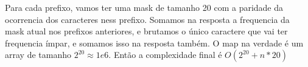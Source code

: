 % 

Para cada prefixo, vamos ter uma mask de tamanho 20 com a paridade da ocorrencia dos caracteres ness prefixo. Somamos na resposta a frequencia da mask atual nos prefixos anteriores, e brutamos o único caractere que vai ter frequencia ímpar, e somamos isso na resposta também. O map na verdade é um array de tamanho $2^{20} \approx 1e6$. Então a complexidade final é $O(2^{20} + n * 20)$

